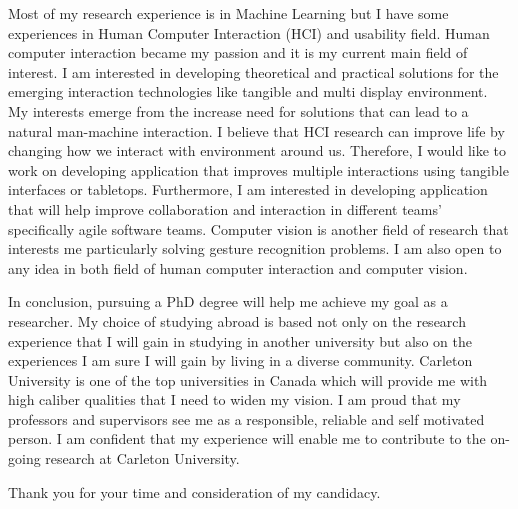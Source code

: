 \documentclass[10pt]{article}%
\begin{document}
Most of my research experience is in Machine Learning but I have some experiences in Human Computer Interaction (HCI) and usability field. Human computer interaction became my passion and it is my current main field of interest. I am interested in developing theoretical and practical solutions for the emerging interaction technologies like tangible and multi display environment. My interests emerge from the increase need for solutions that can lead to a natural man-machine interaction. I believe that HCI research can improve life by changing how we interact with environment around us. Therefore, I would like to work on developing application that improves multiple interactions using tangible interfaces or tabletops. Furthermore, I am interested in developing application that will help improve collaboration and interaction in different teams’ specifically agile software teams. Computer vision is another field of research that interests me particularly solving gesture recognition problems. I am also open to any idea in both field of human computer interaction and computer vision.  


  	In conclusion, pursuing a PhD degree will help me achieve my goal as a researcher. My choice of studying abroad is based not only on the research experience that I will gain in  studying in another university but also on the experiences I am sure I will gain by living in a diverse community.  Carleton University is one of the top universities in Canada which will provide me with high caliber qualities that I need to widen my vision. I am proud that my professors and supervisors see me as a responsible, reliable and self motivated person. I am confident that my experience will enable me to contribute to the on-going research at Carleton University.


\noindent Thank you for your time and consideration of my candidacy.
\end{document}
